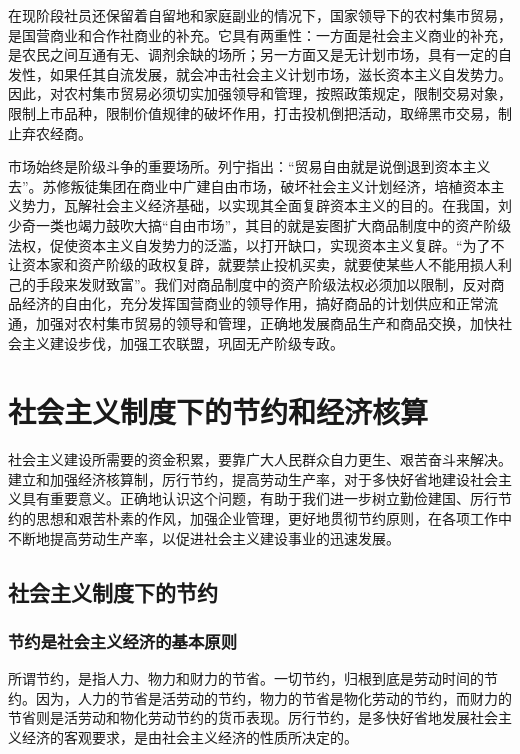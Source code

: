 \documentclass{book}
\begin{document}
在现阶段社员还保留着自留地和家庭副业的情况下，国家领导下的农村集市贸易，是国营商业和合作社商业的补充。它具有两重性：一方面是社会主义商业的补充，是农民之间互通有无、调剂余缺的场所；另一方面又是无计划市场，具有一定的自发性，如果任其自流发展，就会冲击社会主义计划市场，滋长资本主义自发势力。因此，对农村集市贸易必须切实加强领导和管理，按照政策规定，限制交易对象，限制上市品种，限制价值规律的破坏作用，打击投机倒把活动，取缔黑市交易，制止弃农经商。

市场始终是阶级斗争的重要场所。列宁指出：“贸易自由就是说倒退到资本主义去”。苏修叛徒集团在商业中广建自由市场，破坏社会主义计划经济，培植资本主义势力，瓦解社会主义经济基础，以实现其全面复辟资本主义的目的。在我国，刘少奇一类也竭力鼓吹大搞“自由市场”，其目的就是妄图扩大商品制度中的资产阶级法权，促使资本主义自发势力的泛滥，以打开缺口，实现资本主义复辟。“为了不让资本家和资产阶级的政权复辟，就要禁止投机买卖，就要使某些人不能用损人利己的手段来发财致富”。我们对商品制度中的资产阶级法权必须加以限制，反对商品经济的自由化，充分发挥国营商业的领导作用，搞好商品的计划供应和正常流通，加强对农村集市贸易的领导和管理，正确地发展商品生产和商品交换，加快社会主义建设步伐，加强工农联盟，巩固无产阶级专政。

\chapter{社会主义制度下的节约和经济核算}

社会主义建设所需要的资金积累，要靠广大人民群众自力更生、艰苦奋斗来解决。建立和加强经济核算制，厉行节约，提高劳动生产率，对于多快好省地建设社会主义具有重要意义。正确地认识这个问题，有助于我们进一步树立勤俭建国、厉行节约的思想和艰苦朴素的作风，加强企业管理，更好地贯彻节约原则，在各项工作中不断地提高劳动生产率，以促进社会主义建设事业的迅速发展。

\section{社会主义制度下的节约}

\subsection{节约是社会主义经济的基本原则}

所谓节约，是指人力、物力和财力的节省。一切节约，归根到底是劳动时间的节约。因为，人力的节省是活劳动的节约，物力的节省是物化劳动的节约，而财力的节省则是活劳动和物化劳动节约的货币表现。厉行节约，是多快好省地发展社会主义经济的客观要求，是由社会主义经济的性质所决定的。
\end{document}
